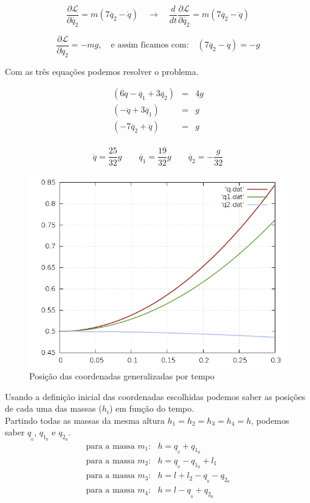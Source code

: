 \documentclass[a4paper,12pt]{exam}
\begin{document}
	\[ \frac{\partial \mathcal{L} }{\partial \dot{q_2}} = m(7\dot{q_2} -\dot{q}) \quad \to \quad \frac{d}{dt}\frac{\partial \mathcal{L} }{\partial \dot{q_2}} = m(7\ddot{q_2}-\ddot{q}) \]
	
	\[ \frac{\partial \mathcal{L} }{\partial q_2} = -mg, \quad \text{e assim ficamos com:} \quad (7\ddot{q_2}-\ddot{q}) = -g\]
	
	Com as três equações podemos resolver o problema.
	
	\[
	\begin{array}{rcl}
		(6\ddot{q} -\ddot{q_1} + 3\ddot{q_2}) & = & 4g \\
		(-\ddot{q}+3\ddot{q_1}) & = & g \\
		(-7\ddot{q_2}+\ddot{q}) & = & g \\
	\end{array}
	\]
	
	
	\[ \ddot{q} = \frac{25}{32}g \quad \quad \ddot{q_1} = \frac{19}{32}g \quad \quad \ddot{q_2} = -\frac{g}{32} \]		
		
	\begin{figure}[h]
		\centering
		\includegraphics[scale=0.5]{Graph.png}
		\caption{Posição das coordenadas generalizadas por tempo}
	\end{figure}
	
	Usando a definição inicial das coordenadas escolhidas podemos saber as posições de cada uma das massas ($h_i$) em função do tempo. \\
	Partindo todas as massas da mesma altura $h_1 = h_2 = h_3 = h_4 = h$, podemos saber $q_{_{0}}$, $q_{1_0}$ e $q_{2_0}$.
	\[
	\begin{array}{ll}
	\text{para a massa } m_1 \text{:} & h = q_{_0} + q_{1_0} \\
	\text{para a massa } m_2 \text{:} & h = q_{_0} - q_{1_0} + l_1 \\
	\text{para a massa } m_3 \text{:} & h = l + l_2 - q_{_0} - q_{2_0} \\
	\text{para a massa } m_4 \text{:} & h = l - q_{_0} + q_{2_0} \\ 
	\end{array}
	\]
	
\end{document}
